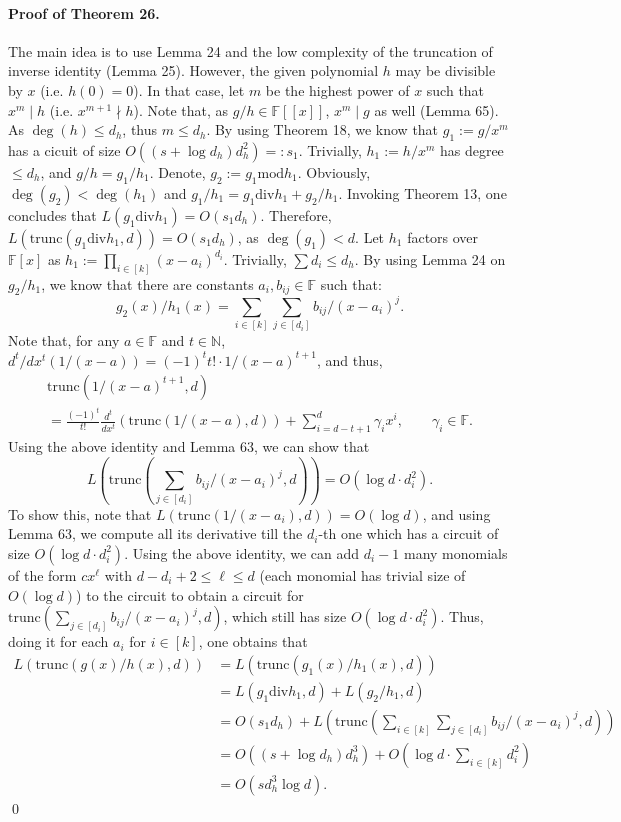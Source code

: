 \documentclass[10pt,a4paper]{article}
\begin{document}
\paragraph{Proof of Theorem 26.} The main idea is to use Lemma 24 and the low complexity of the truncation of inverse identity (Lemma 25). However, the given polynomial $h$ may be divisible by $x$ (i.e. $h(0)=0$). In that case, let $m$ be the highest power of $x$ such that $x^m\mid h$ (i.e. $x^{m+1}\nmid h$). Note that, as $g/h\in\mathbb F[[x]]$, $x^m\mid g$ as well (Lemma 65). As $\deg(h)\le d_h$, thus $m\le d_h$.
By using Theorem 18, we know that $g_1:=g/x^m$ has a cicuit of size $O((s+\log d_h)d_h^2)=:s_1$. Trivially, $h_1:=h/x^m$ has degree $\le d_h$, and $g/h=g_1/h_1$. Denote, $g_2:=g_1\mathbin{\mathrm{mod}}h_1$. Obviously, $\deg(g_2)<\deg(h_1)$ and $g_1/h_1=g_1\mathbin{\mathrm{div}}h_1+g_2/h_1$. Invoking Theorem 13, one concludes that $L(g_1\mathbin{\mathrm{div}}h_1)=O(s_1d_h)$. Therefore, $L(\mathrm{trunc}(g_1\mathbin{\mathrm{div}}h_1,d))=O(s_1d_h)$, as $\deg(g_1)<d$.
Let $h_1$ factors over $\mathbb F[x]$ as $h_1:=\prod_{i\in[k]}(x-a_i)^{d_i}$. Trivially, $\sum d_i\le d_h$. By using Lemma 24 on $g_2/h_1$, we know that there are constants $a_i,b_{ij}\in\mathbb F$ such that:
\[g_2(x)/h_1(x)=\sum_{i\in[k]}\sum_{j\in[d_i]}b_{ij}/(x-a_i)^j.\]
Note that, for any $a\in\mathbb F$ and $t\in\mathbb N$, $d^t/dx^t(1/(x-a))=(-1)^tt!\cdot1/(x-a)^{t+1}$, and thus,
\begin{multline*}\mathrm{trunc}(1/(x-a)^{t+1},d)\\=\frac{(-1)^t}{t!}\frac{d^t}{dx^t}(\mathrm{trunc}(1/(x-a),d))+\sum_{i=d-t+1}^d\gamma_ix^i,\qquad\gamma_i\in\mathbb F.\end{multline*}
Using the above identity and Lemma 63, we can show that
\[L\left(\mathrm{trunc}\left(\sum_{j\in[d_i]}b_{ij}/(x-a_i)^j,d\right)\right)=O(\log d\cdot d_i^2).\]
To show this, note that $L(\mathrm{trunc}(1/(x-a_i),d))=O(\log d)$, and using Lemma 63, we compute all its derivative till the $d_i$-th one which has a circuit of size $O(\log d\cdot d_i^2)$. Using the above identity, we can add $d_i-1$ many monomials of the form $cx^\ell$ with $d-d_i+2\le\ell\le d$ (each monomial has trivial size of $O(\log d)$) to the circuit to obtain a circuit for $\mathrm{trunc}(\sum_{j\in[d_i]}b_{ij}/(x-a_i)^j,d)$, which still has size $O(\log d\cdot d_i^2)$. Thus, doing it for each $a_i$ for $i\in[k]$, one obtains that
\begin{align*}L(\mathrm{trunc}(g(x)/h(x),d))&=L(\mathrm{trunc}(g_1(x)/h_1(x),d))\\&=L(g_1\mathbin{\mathrm{div}}h_1,d)+L(g_2/h_1,d)\\&=O(s_1d_h)+L\left(\mathrm{trunc}\left(\sum_{i\in[k]}\sum_{j\in[d_i]}b_{ij}/(x-a_i)^j,d\right)\right)\\&=O((s+\log d_h)d_h^3)+O\left(\log d\cdot\sum_{i\in[k]}d_i^2\right)\\&=O(sd_h^3\log d).\end{align*}\qed
\end{document}
